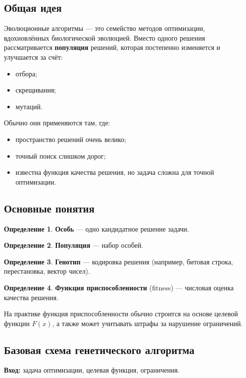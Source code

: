 \documentclass[12pt,a4paper]{article}
\theoremstyle{definition}
\newtheorem{definition}{Определение}[section]
\theoremstyle{plain}
\begin{document}
\subsection{Общая идея}
Эволюционные алгоритмы --- это семейство методов оптимизации, вдохновлённых биологической эволюцией. Вместо одного решения рассматривается \textbf{популяция} решений, которая постепенно изменяется и улучшается за счёт:
\begin{itemize}
\item отбора;
\item скрещивания;
\item мутаций.
\end{itemize}

Обычно они применяются там, где:
\begin{itemize}
\item пространство решений очень велико;
\item точный поиск слишком дорог;
\item известна функция качества решения, но задача сложна для точной оптимизации.
\end{itemize}

\subsection{Основные понятия}
\begin{definition}
\textbf{Особь} --- одно кандидатное решение задачи.
\end{definition}

\begin{definition}
\textbf{Популяция} --- набор особей.
\end{definition}

\begin{definition}
\textbf{Генотип} --- кодировка решения (например, битовая строка, перестановка, вектор чисел).
\end{definition}

\begin{definition}
\textbf{Функция приспособленности} (fitness) --- числовая оценка качества решения.
\end{definition}

На практике функция приспособленности обычно строится на основе целевой функции $F(x)$, а также может учитывать штрафы за нарушение ограничений.

\subsection{Базовая схема генетического алгоритма}
\textbf{Вход:} задача оптимизации, целевая функция, ограничения.
\end{document}

